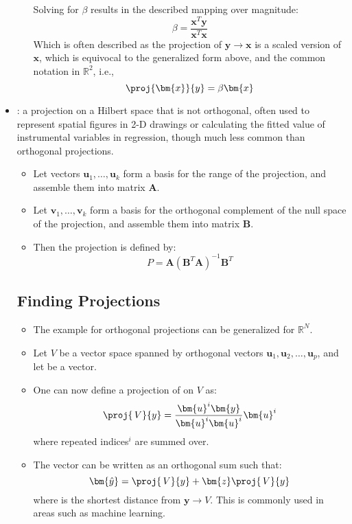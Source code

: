 \begin{itemize}
\begin{itemize}
      Solving for \(\beta \) results in the described mapping over magnitude:
      \[%
      \beta = \frac{\bm{x}^T \bm{y}}{\bm{x}^T \bm{x}}
      \]%
      Which is often described as the projection of \(\bm{y} \to \bm{x}\) is a scaled version of \(\bm{x}\), which is equivocal to the generalized form above, and the common notation in \(\mathbb{R}^2\), i.e.,
      \[%
      \proj{\bm{x}}{y} = \beta \bm{x}
      \]%
    \end{itemize}
  \item {}: a projection on a Hilbert space that is not orthogonal, often used to represent spatial figures in 2-D drawings or calculating the fitted value of instrumental variables in regression, though much less common than orthogonal projections. 
    \begin{itemize}
      \item Let vectors \(\bm{u}_1,\ldots,\bm{u}_k\) form a basis for the range of the projection, and assemble them into matrix \(\bm{A}\). 
      \item Let \(\bm{v}_1,\ldots,\bm{v}_k\) form a basis for the orthogonal complement of the null space of the projection, and assemble them into matrix \(\bm{B}\).
      \item Then the projection is defined by:
      \[%
      P = \bm{A}(\bm{B}^T \bm{A})^{-1} \bm{B}^T
      \]%
    \end{itemize}
  
  \subsection{Finding Projections}\label{Finding Projections}
  \begin{itemize}
    \item The example for orthogonal projections can be generalized for \(\mathbb{R}^N\). 
    \item Let \(V\) be a vector space spanned by orthogonal vectors \(\bm{u}_1,\bm{u}_2,\ldots,\bm{u}_p\), and let  be a vector.
    \item One can now define a projection of  on \(V\) as:
    \[%
    \proj{\, V}{y}=\frac{\bm{u}^i \bm{y}}{\bm{u}^i \bm{u}^i} \bm{u}^i
    \]%
    where repeated indices\(^i\) are summed over.
    \item The vector  can be written as an orthogonal sum such that:
    \[%
    \bm{\hat{y}} = \proj{\, V}{y} + \bm{z} \proj{\, V}{y}
    \]%
    where  is the shortest distance from \(\bm{y} \to V\). This is commonly used in areas such as machine learning.
  \end{itemize}
  
\end{itemize}


